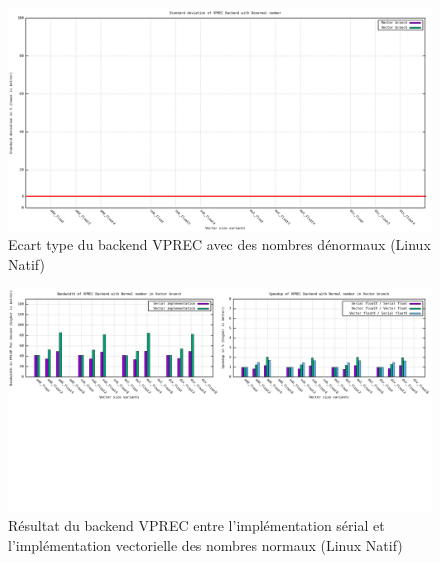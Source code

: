 \documentclass[11pt, letterpaper]{article}
\begin{document}
\begin{figure}[htbp]
\centering
\includegraphics[width=450px]{../ressources/laptop_vprec_denormal_stddev.png}
\caption{\label{fig:orga180efb}Ecart type du backend VPREC avec des nombres dénormaux (Linux Natif)}
\end{figure}

\begin{figure}[htbp]
\centering
\includegraphics[width=450px]{../ressources/laptop_vprec_serial_vs_vector.png}
\caption{\label{fig:org841cf29}Résultat du backend VPREC entre l'implémentation sérial et l'implémentation vectorielle des nombres normaux (Linux Natif)}
\end{figure}
\end{document}

